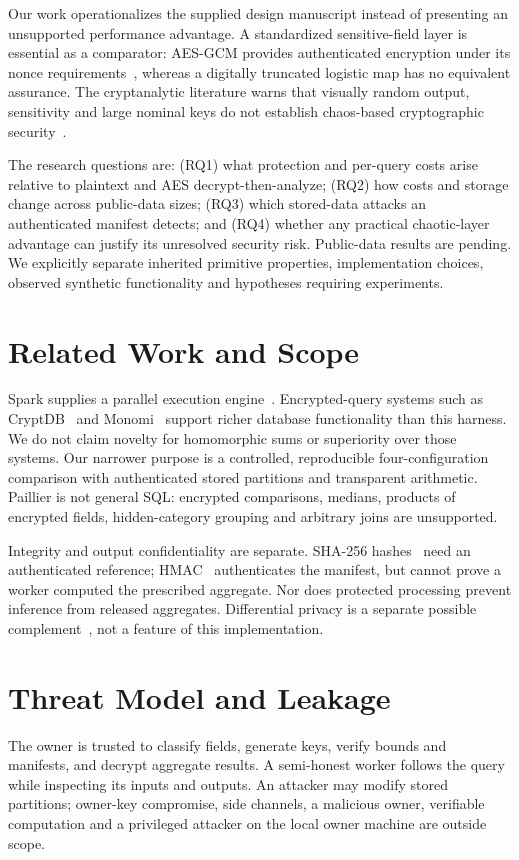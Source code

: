 \documentclass[conference]{IEEEtran}
\begin{document}
Our work operationalizes the supplied design manuscript instead of presenting an unsupported performance advantage. A standardized sensitive-field layer is essential as a comparator: AES-GCM provides authenticated encryption under its nonce requirements~\cite{aes,gcm}, whereas a digitally truncated logistic map has no equivalent assurance. The cryptanalytic literature warns that visually random output, sensitivity and large nominal keys do not establish chaos-based cryptographic security~\cite{alvarez,arroyo}.

The research questions are: (RQ1) what protection and per-query costs arise relative to plaintext and AES decrypt-then-analyze; (RQ2) how costs and storage change across public-data sizes; (RQ3) which stored-data attacks an authenticated manifest detects; and (RQ4) whether any practical chaotic-layer advantage can justify its unresolved security risk. Public-data results are pending. We explicitly separate inherited primitive properties, implementation choices, observed synthetic functionality and hypotheses requiring experiments.

\section{Related Work and Scope}
Spark supplies a parallel execution engine~\cite{spark}. Encrypted-query systems such as CryptDB~\cite{cryptdb} and Monomi~\cite{monomi} support richer database functionality than this harness. We do not claim novelty for homomorphic sums or superiority over those systems. Our narrower purpose is a controlled, reproducible four-configuration comparison with authenticated stored partitions and transparent arithmetic. Paillier is not general SQL: encrypted comparisons, medians, products of encrypted fields, hidden-category grouping and arbitrary joins are unsupported.

Integrity and output confidentiality are separate. SHA-256 hashes~\cite{sha256} need an authenticated reference; HMAC~\cite{hmac} authenticates the manifest, but cannot prove a worker computed the prescribed aggregate. Nor does protected processing prevent inference from released aggregates. Differential privacy is a separate possible complement~\cite{dwork}, not a feature of this implementation.

\section{Threat Model and Leakage}
The owner is trusted to classify fields, generate keys, verify bounds and manifests, and decrypt aggregate results. A semi-honest worker follows the query while inspecting its inputs and outputs. An attacker may modify stored partitions; owner-key compromise, side channels, a malicious owner, verifiable computation and a privileged attacker on the local owner machine are outside scope.
\end{document}
